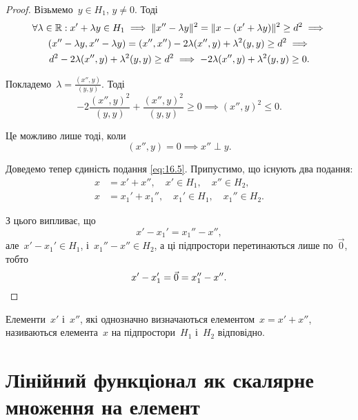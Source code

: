 \begin{proof}
    Візьмемо~$y \in H_1$, $y \ne 0$. Тоді
    \begin{multline*}
        \forall \lambda \in \mathbb{R}:
        x' + \lambda y \in H_1 \implies
        \|x'' - \lambda y\|^2 = \|x - (x' + \lambda y)\|^2 \ge d^2 \implies \\
        (x'' - \lambda y, x'' - \lambda y) = (x'', x'') - 2 \lambda (x'', y) + \lambda^2 (y, y) \ge d^2 \implies \\
        d^2 - 2 \lambda (x'', y) + \lambda^2 (y, y) \ge d^2 \implies
        - 2 \lambda (x'', y) + \lambda^2 (y, y) \ge 0.
    \end{multline*}
    
    Покладемо~$\lambda = \frac{(x'', y)}{(y, y)}$. Тоді
    \begin{equation*}
        - 2\frac{(x'', y)^2}{(y, y)} + \frac{(x'', y)^2}{(y, y)} \ge 0 \implies
        (x'', y)^2 \le 0.
    \end{equation*}
    
    Це можливо лише тоді, коли
    \begin{equation*}
        (x'', y) = 0 \implies x'' \perp y.
    \end{equation*}
    
    Доведемо тепер єдиність подання \eqref{eq:16.5}. Припустимо, що існують два подання:
    \begin{align*}
        x &= x' + x'', \quad x' \in H_1, \quad x'' \in H_2, \\
        x &= x_1' + x_1'', \quad x_1' \in H_1, \quad x_1'' \in H_2.
    \end{align*}
    
    З цього випливає, що
    \begin{equation*}
        x' - x_1' = x_1'' - x'',
    \end{equation*}
    але~$x' - x_1' \in H_1$, і~$x_1'' - x'' \in H_2$, а ці підпростори перетинаються лише по~$\vec 0$, тобто
    \begin{equation*}
        x' - x_1' = \vec 0 = x_1'' - x''. \qedhere
    \end{equation*}
\end{proof}

\begin{definition}
    Елементи~$x'$ і~$x''$, які однозначно визначаються елементом~$x = x' + x''$, називаються  елемента~$x$ на підпростори~$H_1$ і~$H_2$ відповідно.
\end{definition}

\section{Лінійний функціонал як скалярне множення на елемент}

